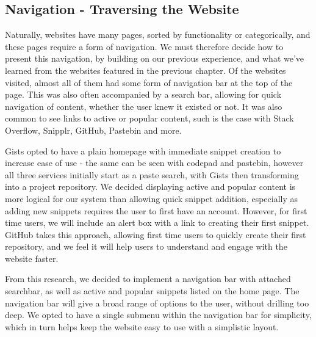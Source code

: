 \subsection{Navigation - Traversing the Website}

Naturally, websites have many pages, sorted by functionality or categorically, and these pages require a form of navigation.
We must therefore decide how to present this navigation, by building on our previous experience, and what we've learned from the websites featured in the previous chapter.
Of the websites visited, almost all of them had some form of navigation bar at the top of the page. 
This was also often accompanied by a search bar, allowing for quick navigation of content, whether the user knew it existed or not.
It was also common to see links to active or popular content, such is the case with Stack Overflow, Snipplr, GitHub, Pastebin and more.

Gists opted to have a plain homepage with immediate snippet creation to increase ease of use - the same can be seen with codepad and pastebin, however all three services initially start as a paste search, with Gists then transforming into a project repository.
We decided displaying active and popular content is more logical for our system than allowing quick snippet addition, especially as adding new snippets requires the user to first have an account.
However, for first time users, we will include an alert box with a link to creating their first snippet. GitHub takes this approach, allowing first time users to quickly create their first repository, and we feel it will help users to understand and engage with the website faster.

From this research, we decided to implement a navigation bar with attached searchbar, as well as active and popular snippets listed on the home page. 
The navigation bar will give a broad range of options to the user, without drilling too deep.
We opted to have a single submenu within the navigation bar for simplicity, which in turn helps keep the website easy to use with a simplistic layout.


